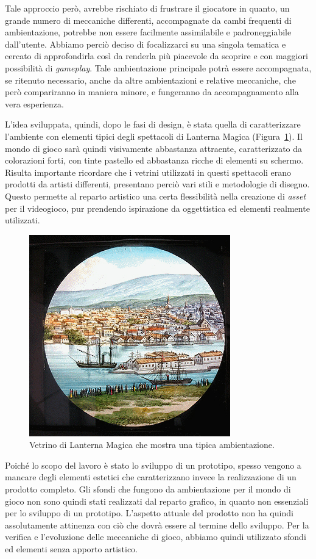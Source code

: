 Tale approccio però, avrebbe rischiato di frustrare il giocatore in quanto, un grande numero di meccaniche differenti, accompagnate da cambi frequenti di ambientazione, potrebbe non essere facilmente assimilabile e padroneggiabile dall’utente. Abbiamo perciò deciso di focalizzarci su una singola tematica e cercato di approfondirla così da renderla più piacevole da scoprire e con maggiori possibilità di \textit{gameplay}.
Tale ambientazione principale potrà essere accompagnata, se ritenuto necessario, anche da altre ambientazioni e relative meccaniche, che però compariranno in maniera minore, e fungeranno da accompagnamento alla vera esperienza.

L’idea sviluppata, quindi, dopo le fasi di design, è stata quella di caratterizzare l’ambiente con elementi tipici degli spettacoli di Lanterna Magica (Figura~\ref{fig:ambientazione_lanterna}). Il mondo di gioco sarà quindi visivamente abbastanza attraente, caratterizzato da colorazioni forti, con tinte pastello ed abbastanza ricche di elementi su schermo. Risulta importante ricordare che i vetrini utilizzati in questi spettacoli erano prodotti da artisti differenti, presentano perciò vari stili e metodologie di disegno. Questo permette al reparto artistico una certa flessibilità nella creazione di \textit{asset} per il videogioco, pur prendendo ispirazione da oggettistica ed elementi realmente utilizzati.

\begin{figure}%
	\centering
	\includegraphics[width= 0.5\columnwidth]{images/gameDesign/29_lanterna.jpg}
	\caption{Vetrino di Lanterna Magica che mostra una tipica ambientazione.}
	\label{fig:ambientazione_lanterna}
\end{figure} 

Poiché lo scopo del lavoro è stato lo sviluppo di un prototipo, spesso vengono a mancare degli elementi estetici che caratterizzano invece la realizzazione di un prodotto completo. Gli sfondi che fungono da ambientazione per il mondo di gioco non sono quindi stati realizzati dal reparto grafico, in quanto non essenziali per lo sviluppo di un prototipo.
L’aspetto attuale del prodotto non ha quindi assolutamente attinenza con ciò che dovrà essere al termine dello sviluppo.
Per la verifica e l’evoluzione delle meccaniche di gioco, abbiamo quindi utilizzato sfondi ed elementi senza apporto artistico.

